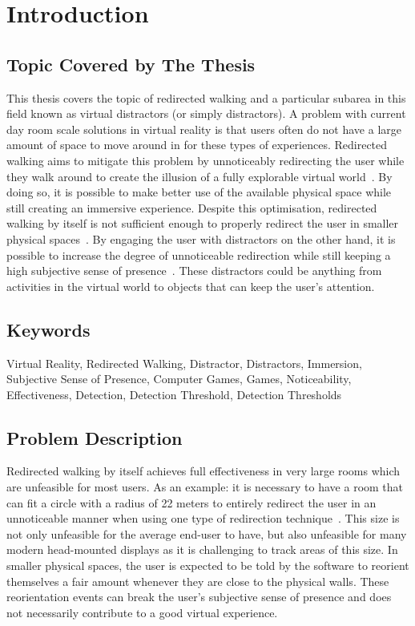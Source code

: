 \chapter{Introduction}
\label{chap:introduction}

\section{Topic Covered by The Thesis}
This thesis covers the topic of redirected walking and a particular subarea in this field known as virtual distractors (or simply distractors). A problem with current day room scale solutions in virtual reality is that users often do not have a large amount of space to move around in for these types of experiences. Redirected walking aims to mitigate this problem by unnoticeably redirecting the user while they walk around to create the illusion of a fully explorable virtual world~\cite{razzaque2001redirected}. By doing so, it is possible to make better use of the available physical space while still creating an immersive experience. Despite this optimisation, redirected walking by itself is not sufficient enough to properly redirect the user in smaller physical spaces~\cite{5072212,azmandian2015physical}. By engaging the user with distractors on the other hand, it is possible to increase the degree of unnoticeable redirection while still keeping a high subjective sense of presence~\cite{peck2009evaluation}. These distractors could be anything from activities in the virtual world to objects that can keep the user's attention.  


\section{Keywords}
Virtual Reality, Redirected Walking, Distractor, Distractors, Immersion, Subjective Sense of Presence, Computer Games, Games, Noticeability, Effectiveness, Detection, Detection Threshold, Detection Thresholds

\section{Problem Description}
Redirected walking by itself achieves full effectiveness in very large rooms which are unfeasible for most users. As an example: it is necessary to have a room that can fit a circle with a radius of 22 meters to entirely redirect the user in an unnoticeable manner when using one type of redirection technique~\cite{5072212, azmandian2015physical}. This size is not only unfeasible for the average end-user to have, but also unfeasible for many modern head-mounted displays as it is challenging to track areas of this size. In smaller physical spaces, the user is expected to be told by the software to reorient themselves a fair amount whenever they are close to the physical walls. These reorientation events can break the user's subjective sense of presence and does not necessarily contribute to a good virtual experience. 

